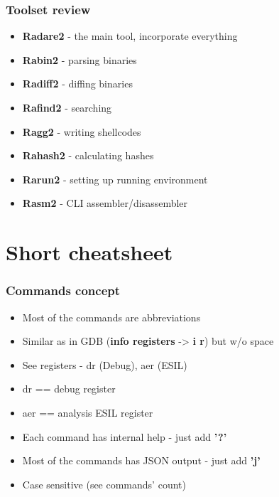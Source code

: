 \documentclass[10pt,pdf,utf8,english,compress,hyperref={unicode}]{beamer}
\begin{document}
\begin{frame}[fragile]
  \frametitle{Toolset review}
  \begin{itemize}
	\item \textbf{Radare2} - the main tool, incorporate everything
	\item \textbf{Rabin2} - parsing binaries
	\item \textbf{Radiff2} - diffing binaries
	\item \textbf{Rafind2} - searching
	\item \textbf{Ragg2} - writing shellcodes
	\item \textbf{Rahash2} - calculating hashes
	\item \textbf{Rarun2} - setting up running environment
	\item \textbf{Rasm2} - CLI assembler/disassembler
  \end{itemize}
\end{frame}

\section{Short cheatsheet}

\begin{frame}[fragile]
  \frametitle{Commands concept}
  \begin{itemize}
	  \item Most of the commands are abbreviations
	  \item Similar as in GDB (\textbf{info registers} -> \textbf{i r}) but w/o space
	  \item See registers - \alert{dr} (Debug), \alert{aer} (ESIL)
	  \item \alert{dr} == debug register
	  \item \alert{aer} == analysis ESIL register
	  \item Each command has internal help - just add \textbf{'?'}
	  \item Most of the commands has JSON output - just add \textbf{'j'}
	  \item Case sensitive (see commands' count)
  \end{itemize}
\end{frame}
\end{document}
